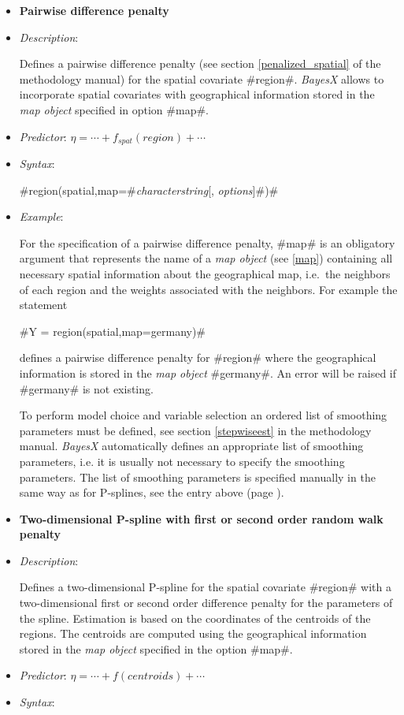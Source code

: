 \begin{itemize}
\item[]{\bf\sffamily Pairwise difference penalty}

\item[] {\em Description}:

Defines a pairwise difference penalty (see section \autoref{penalized_spatial}
of the methodology manual)  for the spatial covariate
#region#. {\em BayesX} allows to incorporate spatial covariates
with geographical information stored in the {\em map object}
specified in option #map#.
\item[] {\em Predictor}: $\eta = \cdots
+ f_{spat}(region) + \cdots$ \item[] {\em Syntax}:

#region(spatial,map=#{\em characterstring}[, {\em options}]#)#
\item[] {\em Example}:

For the specification of a pairwise difference penalty, #map# is an
obligatory argument that represents the name of a {\em map object}
(see \autoref{map}) containing all necessary spatial information
about the geographical map, i.e.~the neighbors of each region and
the weights associated with the neighbors. For example the
statement

#Y = region(spatial,map=germany)#

defines a pairwise difference penalty for #region# where the
geographical information is stored in the {\em map object}
#germany#. An error will be raised if #germany# is not existing.

To perform model choice and variable selection an ordered list of smoothing parameters must be defined, see section
\autoref{stepwiseest}
in the methodology manual. {\em BayesX} automatically defines an appropriate list of smoothing parameters, i.e. it
is usually not necessary to  specify the smoothing parameters.
The list of smoothing parameters is specified manually in the same way as for P-splines,
see the entry above (page \pageref{psplines_stepwise}).


\item[]{\bf\sffamily Two-dimensional P-spline with first or second order
random walk penalty}

\item[] {\em Description}:

Defines a two-dimensional P-spline for the spatial covariate
#region# with a two-dimensional first or second order difference penalty
for the parameters of the spline. Estimation is based on the
coordinates of the centroids of the regions. The centroids are
computed using the geographical information stored in the {\em map
object} specified in the option #map#.
\item[] {\em Predictor}:
$\eta= \cdots + f(centroids) + \cdots$ \item[] {\em Syntax}:


\end{itemize}
